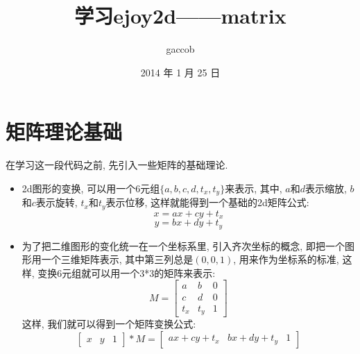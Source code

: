 

\title {\ZHH \huge 学习ejoy2d——matrix}
\author {\small gaccob}
\date {\small 2014 年 1 月 25 日}
\maketitle

\vspace {10pt}
\section{\Large \ZHH 矩阵理论基础} {
    { 在学习这一段代码之前, 先引入一些矩阵的基础理论. }

    \begin {itemize}

    \item {
        2d图形的变换, 可以用一个6元组$\{a, b, c, d, t_x, t_y\}$来表示, 其中, $a$和$d$表示缩放, $b$和$c$表示旋转, $t_x$和$t_y$表示位移, 这样就能得到一个基础的2d矩阵公式:
        \begin{equation}\label{raw1}
            x = ax + cy + t_x
        \end{equation}
        \begin{equation}\label{raw2}
            y = bx + dy + t_y
        \end{equation}
    }

    \item {
        为了把二维图形的变化统一在一个坐标系里, 引入齐次坐标的概念, 即把一个图形用一个三维矩阵表示, 其中第三列总是$(0,0,1)$, 用来作为坐标系的标准, 这样, 变换6元组就可以用一个3*3的矩阵来表示:
         \begin{equation}\label{matrix}
            M =
            \begin{bmatrix}
                a & b & 0 \\
                c & d & 0 \\
                t_x & t_y & 1
            \end{bmatrix}
        \end{equation}
        这样, 我们就可以得到一个矩阵变换公式:
        \begin{equation}\label{transform}
            \begin{bmatrix}
                x & y & 1
            \end{bmatrix}
            * M =
            \begin{bmatrix}
                ax + cy + t_x & bx + dy + t_y & 1
            \end{bmatrix}
        \end{equation}
    }


\end{itemize}}
